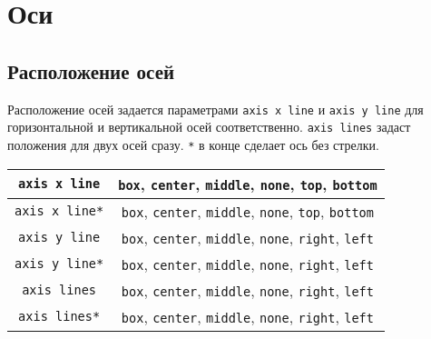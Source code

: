\documentclass[12pt, a4paper]{article}
\begin{document}
\section{Оси}
\subsection{Расположение осей}

Расположение осей задается параметрами \verb|axis x line| и  \verb|axis y line| для горизонтальной и вертикальной осей соответственно. \verb|axis lines| задаст положения для двух осей сразу. \verb|*| в конце сделает ось без стрелки.
\begin{table}[H]
	\centering
	\begin{tabular}{|c|c|}
		\hline
		\verb|axis x line|&\verb*|box|, \verb*|center|, \verb*|middle|, \verb*|none|, \verb*|top|, \verb*|bottom| \\ \hline
		\verb|axis x line*|&\verb*|box|, \verb*|center|, \verb*|middle|, \verb*|none|, \verb*|top|, \verb*|bottom| \\ \hline
		\verb|axis y line|&\verb*|box|, \verb*|center|, \verb*|middle|, \verb*|none|, \verb*|right|, \verb*|left|\\ \hline
		\verb|axis y line*|&\verb*|box|, \verb*|center|, \verb*|middle|, \verb*|none|, \verb*|right|, \verb*|left|\\ \hline
		\verb|axis lines|&\verb*|box|, \verb*|center|, \verb*|middle|, \verb*|none|, \verb*|right|, \verb*|left|\\ \hline
		\verb|axis lines*|&\verb*|box|, \verb*|center|, \verb*|middle|, \verb*|none|, \verb*|right|, \verb*|left|\\ \hline
		  
	\end{tabular}
\end{table}

\begin{figure}[H]
\begin{subfigure}[c]{0.55\linewidth}
\centering
{}
\end{subfigure}
\begin{subfigure}[c]{0.45\linewidth}
\begin{code}
\end{code}
\end{subfigure}
\end{figure}
\end{document}
